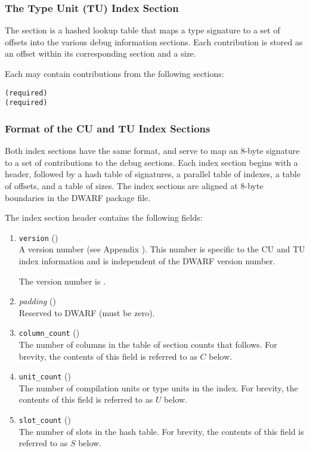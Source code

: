 \subsubsection{The Type Unit (TU) Index Section}
The \dotdebugtuindex{} section is a hashed lookup table that maps a
type signature to a set of offsets into the various debug
information sections. Each contribution is stored as an offset
within its corresponding section and a size.

Each \typeunitset{} may contain contributions from the following
sections:
\begin{alltt}
    \dotdebuginfodwo{} (required) 
    \dotdebugabbrevdwo{} (required)
    \dotdebuglinedwo
    \dotdebugstroffsetsdwo
\end{alltt}

\subsubsection{Format of the CU and TU Index Sections}
Both index sections have the same format, and serve to map an
8-byte signature to a set of contributions to the debug sections.
Each index section begins with a header, followed by a hash table of
signatures, a parallel table of indexes, a table of offsets, and
a table of sizes. The index sections are aligned at 8-byte
boundaries in the DWARF package file.

The index section header contains the following fields:
\begin{enumerate}[1. ]
\item \texttt{version} (\HFTuhalf) \\
A version number
(see Appendix ). 
This number is specific to the CU and TU index information
and is independent of the DWARF version number.

The version number is \versiondotdebugcuindex.

\item \textit{padding} (\HFTuhalf) \\
Reserved to DWARF (must be zero).

\item \texttt{column\_count} (\HFTuword) \\
The number of columns in the table of section counts that follows.
For brevity, the contents of this field is referred to as $C$ below.

\item \texttt{unit\_count} (\HFTuword) \\
The number of compilation units or type units in the index.
For brevity, the contents of this field is referred to as $U$ below.

\item \texttt{slot\_count} (\HFTuword) \\
The number of slots in the hash table.
For brevity, the contents of this field is referred to as $S$ below.

\end{enumerate}

